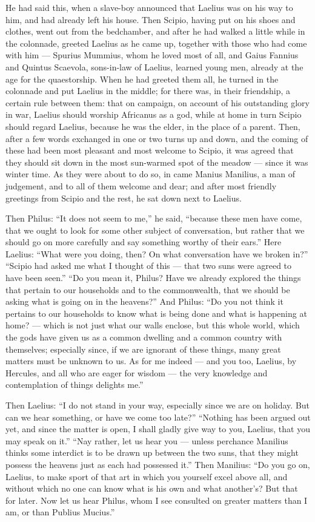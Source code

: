  He had said this, when a slave-boy announced that Laelius was on his way to him, and had already left his house. Then Scipio, having put on his shoes and clothes, went out from the bedchamber, and after he had walked a little while in the colonnade, greeted Laelius as he came up, together with those who had come with him --- Spurius Mummius, whom he loved most of all, and Gaius Fannius and Quintus Scaevola, sons-in-law of Laelius, learned young men, already at the age for the quaestorship. When he had greeted them all, he turned in the colonnade and put Laelius in the middle; for there was, in their friendship, a certain rule between them: that on campaign, on account of his outstanding glory in war, Laelius should worship Africanus as a god, while at home in turn Scipio should regard Laelius, because he was the elder, in the place of a parent. Then, after a few words exchanged in one or two turns up and down, and the coming of these had been most pleasant and most welcome to Scipio, it was agreed that they should sit down in the most sun-warmed spot of the meadow --- since it was winter time. As they were about to do so, in came Manius Manilius, a man of judgement, and to all of them welcome and dear; and after most friendly greetings from Scipio and the rest, he sat down next to Laelius.

 Then Philus: ``It does not seem to me,'' he said, ``because these men have come, that we ought to look for some other subject of conversation, but rather that we should go on more carefully and say something worthy of their ears.'' Here Laelius: ``What were you doing, then? On what conversation have we broken in?'' ``Scipio had asked me what I thought of this --- that two suns were agreed to have been seen.'' ``Do you mean it, Philus? Have we already explored the things that pertain to our households and to the commonwealth, that we should be asking what is going on in the heavens?'' And Philus: ``Do you not think it pertains to our households to know what is being done and what is happening at home? --- which is not just what our walls enclose, but this whole world, which the gods have given us as a common dwelling and a common country with themselves; especially since, if we are ignorant of these things, many great matters must be unknown to us. As for me indeed --- and you too, Laelius, by Hercules, and all who are eager for wisdom --- the very knowledge and contemplation of things delights me.''

 Then Laelius: ``I do not stand in your way, especially since we are on holiday. But can we hear something, or have we come too late?'' ``Nothing has been argued out yet, and since the matter is open, I shall gladly give way to you, Laelius, that you may speak on it.'' ``Nay rather, let us hear you --- unless perchance Manilius thinks some interdict is to be drawn up between the two suns, that they might possess the heavens just as each had possessed it.'' Then Manilius: ``Do you go on, Laelius, to make sport of that art in which you yourself excel above all, and without which no one can know what is his own and what another's? But that for later. Now let us hear Philus, whom I see consulted on greater matters than I am, or than Publius Mucius.''

